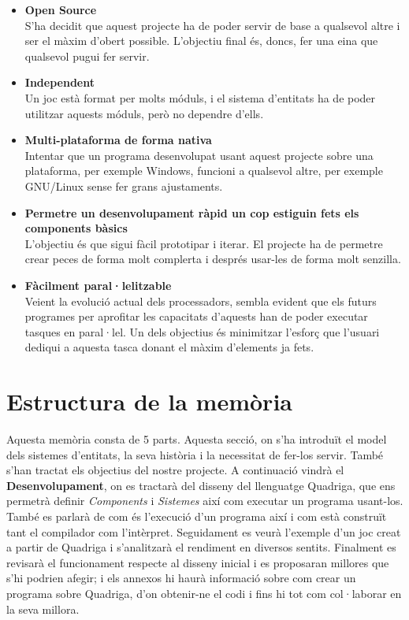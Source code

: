 \begin{itemize}
  \item {\bf Open Source} \hfill \\
    S'ha decidit que aquest projecte ha de poder servir de base a qualsevol altre i ser el màxim d'obert possible. L'objectiu final és, doncs, fer una eina que qualsevol pugui fer servir.
    
  \item {\bf Independent} \hfill \\
    Un joc està format per molts móduls, i el sistema d'entitats ha de poder utilitzar aquests móduls, però no dependre d'ells.
    
  \item {\bf Multi-plataforma de forma nativa} \hfill \\
    Intentar que un programa desenvolupat usant aquest projecte sobre una plataforma, per exemple Windows, funcioni a qualsevol altre, per exemple GNU/Linux sense fer grans ajustaments.
    
  \item {\bf Permetre un desenvolupament ràpid un cop estiguin fets els components bàsics} \hfill \\
    L'objectiu és que sigui fàcil prototipar i iterar. El projecte ha de permetre crear peces de forma molt complerta i després usar-les de forma molt senzilla.
    
  \item {\bf Fàcilment paral·lelitzable} \hfill \\
    Veient la evolució actual dels processadors, sembla evident que els futurs programes per aprofitar les capacitats d'aquests han de poder executar tasques en paral·lel. Un dels objectius és minimitzar l'esforç que l'usuari dediqui a aquesta tasca donant el màxim d'elements ja fets.
\end{itemize}

\section{Estructura de la memòria}

Aquesta memòria consta de 5 parts. Aquesta secció, on s'ha introduït el model dels sistemes d'entitats, la seva història i la necessitat de fer-los servir. També s'han tractat els objectius del nostre projecte. A continuació vindrà el {\bf Desenvolupament}, on es tractarà del disseny del llenguatge Quadriga, que ens permetrà definir {\em Components} i {\em Sistemes} així com executar un programa usant-los. També es parlarà de com és l'execució d'un programa així i com està construït tant el compilador com l'intèrpret. Seguidament es veurà l'exemple d'un joc creat a partir de Quadriga i s'analitzarà el rendiment en diversos sentits. Finalment es revisarà el funcionament respecte al disseny inicial i es proposaran millores que s'hi podrien afegir; i els annexos hi haurà informació sobre com crear un programa sobre Quadriga, d'on obtenir-ne el codi i fins hi tot com col·laborar en la seva millora.